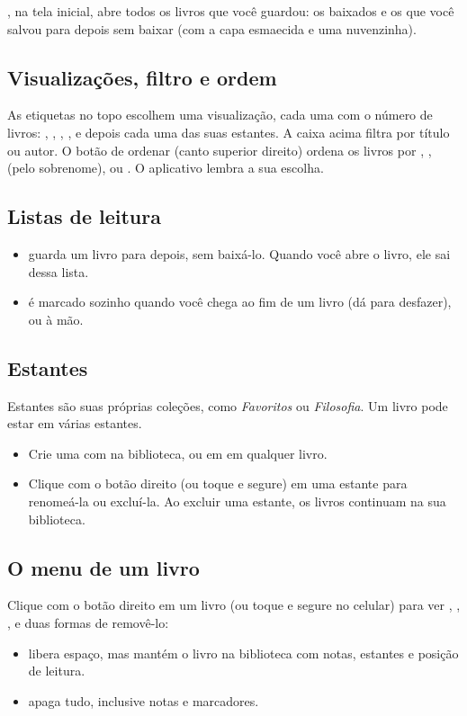 \documentclass[11pt]{article}
\begin{document}
, na tela inicial, abre todos os livros que você guardou: os baixados e
os que você salvou para depois sem baixar (com a capa esmaecida e uma nuvenzinha).


\subsection{Visualizações, filtro e ordem}
As etiquetas no topo escolhem uma visualização, cada uma com o número de livros: ,
, , ,  e depois cada uma das suas estantes. A caixa
acima filtra por título ou autor. O botão de ordenar (canto superior direito) ordena os livros por
, ,  (pelo sobrenome),  ou
. O aplicativo lembra a sua escolha.

\subsection{Listas de leitura}
\begin{itemize}
  \item {} guarda um livro para depois, sem baixá-lo. Quando você abre o livro, ele sai
        dessa lista.
  \item {} é marcado sozinho quando você chega ao fim de um livro (dá para desfazer), ou à
        mão.
\end{itemize}

\subsection{Estantes}
Estantes são suas próprias coleções, como \emph{Favoritos} ou \emph{Filosofia}. Um livro pode
estar em várias estantes.
\begin{itemize}
  \item Crie uma com  na biblioteca, ou em  em
        qualquer livro.
  \item Clique com o botão direito (ou toque e segure) em uma estante para renomeá-la ou
        excluí-la. Ao excluir uma estante, os livros continuam na sua biblioteca.
\end{itemize}

\subsection{O menu de um livro}
Clique com o botão direito em um livro (ou toque e segure no celular) para ver
, , ,  e duas
formas de removê-lo:
\begin{itemize}
  \item {} libera espaço, mas mantém o livro na biblioteca com notas,
        estantes e posição de leitura.
  \item {} apaga tudo, inclusive notas e marcadores.
\end{itemize}
\end{document}
